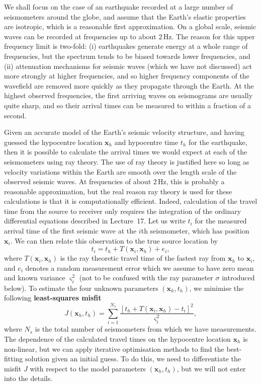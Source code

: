 We shall focus on the case of an earthquake recorded at a large number of seismometers around the globe, and assume that the 
Earth's elastic properties are isotropic, which is a 
reasonable first approximation. On a global scale, seismic waves can be recorded at frequencies up to about $2\,\mathrm{Hz}$. The reason for 
this upper frequency limit is two-fold: (i) earthquakes 
generate energy at a whole range of frequencies, but the spectrum tends to be biased towards lower frequencies, and (ii) attenuation 
mechanisms for seismic waves (which we have not 
discussed) act more strongly at higher frequencies, and so higher frequency components of the wavefield are removed more quickly as 
they propagate through the Earth. At the highest 
observed frequencies, the first arriving waves on seismograms are usually quite sharp, and so their arrival times
 can be measured to within a fraction of a second.

Given an accurate model of the Earth's seismic velocity structure, and having guessed the hypocentre location $\mathbf{x}_{h}$ and 
hypocentre time $t_{h}$ for the earthquake, then it is 
possible to calculate the arrival times we would expect at each of the seismometers using ray theory. The use of ray theory 
is justified here so long as velocity variations 
within the Earth are smooth over the length scale of the observed seismic waves. At frequencies of about $2\,\mathrm{Hz}$, this is probably a 
reasonable approximation, but the real reason 
ray theory is used for these calculations is that it is computationally efficient. Indeed, calculation of the travel time 
from the source to receiver only requires the integration 
of the ordinary differential equations described in Lecture~17. Let us write $t_{i}$ for the measured arrival time of the first 
seismic wave at the $i$th seismometer, which has 
position $\mathbf{x}_{i}$. We can then relate this observation to the true source location by
\begin{equation}
t_{i}=t_{h}+T(\mathbf{x}_{i},\mathbf{x}_{h})+e_{i},
\label{eq:1}
\end{equation}
where $T(\mathbf{x}_{i},\mathbf{x}_{h})$ is the ray theoretic travel time of the fastest ray from $\mathbf{x}_{h}$ to $\mathbf{x}_{i}$, 
and $e_{i}$ denotes a random measurement error which we assume to have zero mean 
and known variance $\varsigma_{i}^{2}$ (not to be confused with the ray parameter $\sigma$ introduced below). To estimate the four unknown parameters $(\mathbf{x}_{h},t_{h})$, we minimise the following 
\textbf{least-squares misfit}
\begin{equation}
J(\mathbf{x}_h, t_h) = \sum_{i=1}^{N_s} \frac{[t_h + T(\mathbf{x}_i, \mathbf{x}_h) - t_i]^2}{\varsigma_i^2},
\label{eq:2}
\end{equation}
where $N_{s}$ is the total number of seismometers from which we have measurements. The dependence of the calculated travel 
times on the hypocentre location $\mathbf{x}_{h}$ is non-linear, but 
we can apply iterative optimisation methods to find the best-fitting solution given an initial guess. To do this, we 
need to differentiate the misfit $J$ with respect to the model 
parameters $(\mathbf{x}_{h},t_{h})$, but we will not enter into the details.


